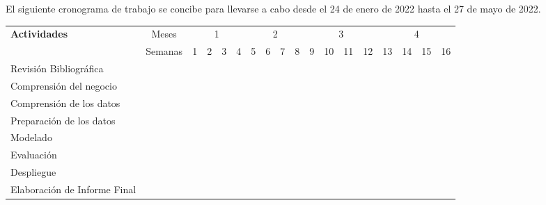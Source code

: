\documentclass[11pt,letterpaper,oneside]{article}
\begin{document}
	El siguiente cronograma de trabajo se concibe para llevarse a cabo desde el 24 de enero de 2022 hasta el 27 de mayo de 2022.
	
	\begin{center}
	\centering
	\tiny 
	
	\begin{tabular}{ |l c|c|c|c|c|c|c|c|c|c|c|c|c|c|c|c|c| }
	 \hline
	 \textbf{Actividades} & Meses & 
	 \multicolumn{4}{c|}{1} & 
	 \multicolumn{4}{c|}{2} & 
	 \multicolumn{4}{c|}{3} & 
	 \multicolumn{4}{c|}{4} 
	 \\ \cline{3-18}
	 
	 & Semanas & 
	 1 & 2 & 3 & 4 & 5 & 6 & 7 & 8 & 9 & 10 & 11 & 12 & 13 & 14 & 15 & 16 
	 \\ \hline
	 
	 Revisión Bibliográfica & &
	 \multicolumn{2}{G|}{} & & & & & & & & & & & & & &
	 \\ \hline
	 
	Comprensión del negocio & &
	&& \multicolumn{1}{G|}{} & & & & & & & & & & & & & 
	\\ \hline
	 
	Comprensión de los datos & &
	 & & & \multicolumn{3}{G|}{} & & & & & & & & & & 
	\\ \hline
	
	Preparación de los datos & &
	& & & & & \multicolumn{3}{G|}{} & & & & & & & & 
	\\ \hline
	
	Modelado & &
	& & & & & & & \multicolumn{5}{G|}{} & & & &
	\\ \hline
	
	Evaluación & &
	& & & & & & & & & & & \multicolumn{3}{G|}{} & & 
	\\ \hline
	
	Despliegue & &
	& & & & & & & & & & & & & \multicolumn{2}{G|}{} &
	\\ \hline
	 
	Elaboración de Informe Final & &
	& & & & & & & & & & & & & & \multicolumn{2}{G|}{} 
	\\ \hline
	 
	\end{tabular}
	\end{center}
	
\end{document}
